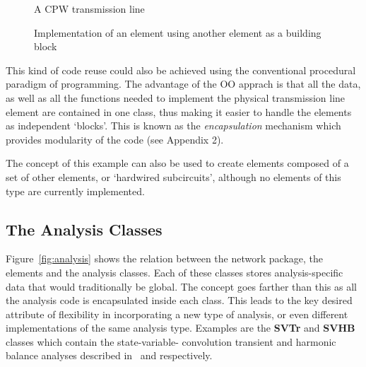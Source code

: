 %
\begin{figure}[htpb]
\centerline{\epsfxsize=12cm }
\caption{A CPW transmission line} \label{fig:CPW}
\end{figure}
%

%
\begin{figure}[htpb]
\centerline{\epsfxsize=10cm }
\caption{Implementation of an element using another element as a building
block} \label{fig:cpwelem}
\end{figure}
%

This kind of code reuse could also be achieved using the conventional
procedural paradigm of programming. The advantage of the OO apprach is
that all the data, as well as all the functions needed to implement
the physical transmission line element are contained in one class,
thus making it easier to handle the elements as independent
`blocks'. This is known as the \emph{encapsulation} mechanism which
provides modularity of the code (see Appendix 2).

The concept of this example can also be used to create elements
composed of a set of other elements, or `hardwired subcircuits',
although no elements of this type are currently implemented.

\subsection{The Analysis Classes}

Figure~\ref{fig:analysis} shows the relation between the network
package, the elements and the analysis classes.  Each of these classes
stores analysis-specific data that would traditionally be global. The
concept goes farther than this as all the analysis code is
encapsulated inside each class. This leads to the key desired
attribute of flexibility in incorporating a new type of analysis, or
even different implementations of the same analysis type.  Examples
are the {\bf SVTr} and {\bf SVHB} classes which contain the
state-variable- convolution transient and harmonic balance analyses
described in~\cite{svtr} and \cite{svhb} respectively.

%
\begin{figure*}[htpb]
\centerline{\epsfxsize=13cm }
\caption{The analysis classes.} \label{fig:analysis}
\end{figure*}
%

